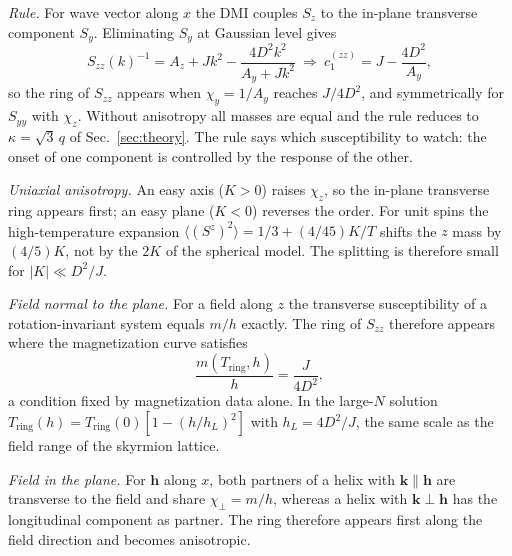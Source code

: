 \documentclass[prb,reprint,longbibliography,superscriptaddress,amsmath,amssymb]{revtex4-2}
\newcommand{\Tr}{T_{\mathrm{ring}}}
\newcommand{\kv}{\mathbf{k}}
\begin{document}
\textit{Rule.} For wave vector along $x$ the DMI couples $S_z$ to the in-plane transverse component $S_y$. Eliminating $S_y$ at Gaussian level gives
\begin{equation}
S_{zz}(k)^{-1}=A_z+Jk^2-\frac{4D^2k^2}{A_y+Jk^2}\ \Rightarrow\ c_1^{(zz)}=J-\frac{4D^2}{A_y},
\label{eq:rule}
\end{equation}
so the ring of $S_{zz}$ appears when $\chi_y=1/A_y$ reaches $J/4D^2$, and symmetrically for $S_{yy}$ with $\chi_z$. Without anisotropy all masses are equal and the rule reduces to $\kappa=\sqrt3\,q$ of Sec.~\ref{sec:theory}. The rule says which susceptibility to watch: the onset of one component is controlled by the response of the other.

\textit{Uniaxial anisotropy.} An easy axis ($K>0$) raises $\chi_z$, so the in-plane transverse ring appears first; an easy plane ($K<0$) reverses the order. For unit spins the high-temperature expansion $\langle(S^z)^2\rangle=1/3+(4/45)K/T$ shifts the $z$ mass by $(4/5)K$, not by the $2K$ of the spherical model. The splitting is therefore small for $|K|\ll D^2/J$.

\textit{Field normal to the plane.} For a field along $z$ the transverse susceptibility of a rotation-invariant system equals $m/h$ exactly. The ring of $S_{zz}$ therefore appears where the magnetization curve satisfies
\begin{equation}
\frac{m(\Tr,h)}{h}=\frac{J}{4D^2},
\label{eq:mh}
\end{equation}
a condition fixed by magnetization data alone. In the large-$N$ solution $\Tr(h)=\Tr(0)[1-(h/h_L)^2]$ with $h_L=4D^2/J$, the same scale as the field range of the skyrmion lattice.

\textit{Field in the plane.} For $\mathbf h$ along $x$, both partners of a helix with $\kv\parallel\mathbf h$ are transverse to the field and share $\chi_\perp=m/h$, whereas a helix with $\kv\perp\mathbf h$ has the longitudinal component as partner. The ring therefore appears first along the field direction and becomes anisotropic.
\end{document}
